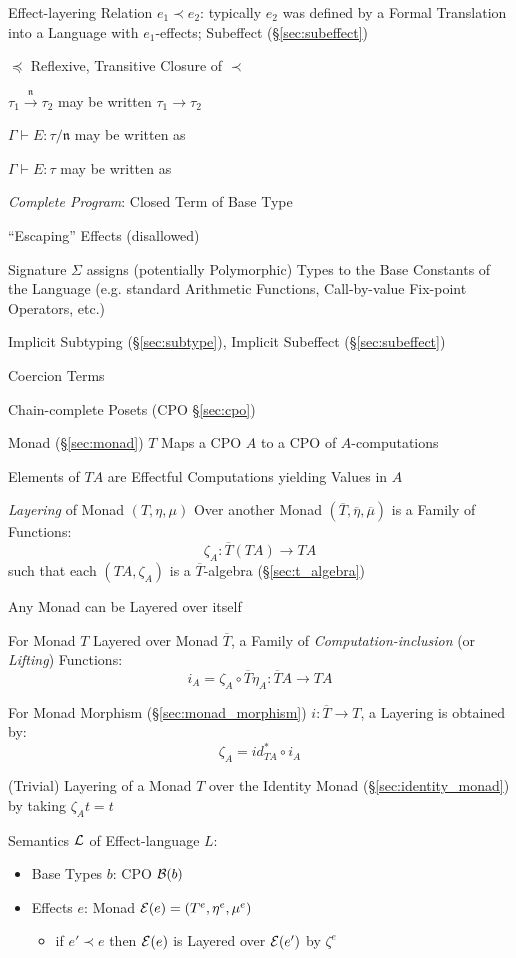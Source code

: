 Effect-layering Relation $e_1 \prec e_2$: typically $e_2$ was defined
by a Formal Translation into a Language with $e_1$-effects; Subeffect
(\S\ref{sec:subeffect})

$\preceq$ Reflexive, Transitive Closure of $\prec$

$\tau_1 \xrightarrow{\mathfrak{n}} \tau_2$ may be written $\tau_1
\rightarrow \tau_2$

$\Gamma \vdash E : \tau / \mathfrak{n}$ may be written as

$\Gamma \vdash E : \tau$ may be written as

\emph{Complete Program}: Closed Term of Base Type

``Escaping'' Effects (disallowed)

Signature $\Sigma$ assigns (potentially Polymorphic) Types to the Base
Constants of the Language (e.g. standard Arithmetic Functions,
Call-by-value Fix-point Operators, etc.)

Implicit Subtyping (\S\ref{sec:subtype}), Implicit Subeffect
(\S\ref{sec:subeffect})

Coercion Terms

Chain-complete Posets (CPO \S\ref{sec:cpo})

Monad (\S\ref{sec:monad}) $T$ Maps a CPO $A$ to a CPO of
$A$-computations

Elements of $T A$ are Effectful Computations yielding Values in $A$

\emph{Layering} of Monad $(T,\eta,\mu)$ Over another Monad
$(\overline{T}, \overline{\eta}, \overline{\mu})$ is a Family of
Functions:
\[
  \zeta_A : \overline{T}(T A) \rightarrow T A
\]
such that each $(T A, \zeta_A)$ is a $\overline{T}$-algebra
(\S\ref{sec:t_algebra}) %

Any Monad can be Layered over itself %

For Monad $T$ Layered over Monad $\overline{T}$, a Family of
\emph{Computation-inclusion} (or \emph{Lifting}) Functions:
\[
  i_A = \zeta_A \circ \overline{T} \eta_A :
    \overline{T} A \rightarrow T A
\]

For Monad Morphism (\S\ref{sec:monad_morphism}) $i : \overline{T}
\rightarrow T$, a Layering is obtained by:
\[
  \zeta_A = id^*_{T A} \circ i_A
\]

(Trivial) Layering of a Monad $T$ over the Identity Monad
(\S\ref{sec:identity_monad}) by taking $\zeta_A t = t$

Semantics $\mathcal{L}$ of Effect-language $L$:
\begin{itemize}
  \item Base Types $b$: CPO $\mathcal{B}(b)$
  \item Effects $e$: Monad $\mathcal{E}(e) = (T^e,\eta^e,\mu^e)$
    \begin{itemize}
      \item if $e' \prec e$ then $\mathcal{E}(e)$ is Layered over
        $\mathcal{E}(e')$ by $\zeta^e$
    \end{itemize}
\end{itemize}

